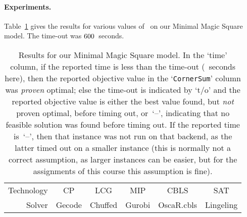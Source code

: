 \documentclass[a4paper,11pt]{article}
\begin{document}
\paragraph{Experiments.}
Table~\ref{tab:res:minMagicSquare} gives the results for various
values of~ on our Minimal Magic Square model.
%
The time-out was $600$~seconds.

\begin{landscape}
  \begin{table}[t]  %
    \centering
    \begin{tabular}{rrrrrrrrrrr}  %
      Technology
      & \multicolumn{2}{c}{CP}
      & \multicolumn{2}{c}{LCG}
      & \multicolumn{2}{c}{MIP}
      & \multicolumn{2}{c}{CBLS}
      & \multicolumn{2}{c}{SAT} \\
      \cmidrule(lr){02-03} \cmidrule(lr){04-05} \cmidrule(lr){06-07}
      \cmidrule(lr){08-09} \cmidrule(lr){10-11}
      Solver  %
      & \multicolumn{2}{c}{Gecode}
      & \multicolumn{2}{c}{Chuffed}
      & \multicolumn{2}{c}{Gurobi}
      & \multicolumn{2}{c}{OscaR.cbls}
      & \multicolumn{2}{c}{Lingeling} \\
      \cmidrule(lr){02-03} \cmidrule(lr){04-05} \cmidrule(lr){06-07}
      \cmidrule(lr){08-09} \cmidrule(lr){10-11}
      
    \end{tabular}
    \caption{Results for our Minimal Magic Square model.
      In the `time' column, if the reported time is less than the
      time-out (\TimeOut~seconds here), then the reported objective
      value in the `\texttt{CornerSum}' column was \emph{proven}
      optimal;
      else the time-out is indicated by `t/o' and the reported
      objective value is either the best value found, but \emph{not}
      proven optimal, before timing out,
      or~`--', indicating that no feasible solution was found before
      timing out.
      If the reported time is~`--', then that instance was not
      run on that backend, as the latter timed out on a smaller instance
      (this is normally not a correct assumption, as larger instances
      can be easier, but for the assignments of this course this
      assumption is fine).}
    \label{tab:res:minMagicSquare}
  \end{table}
\end{landscape}
\end{document}
